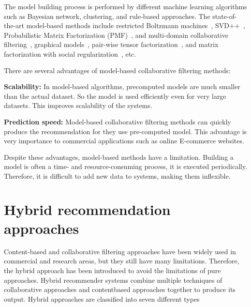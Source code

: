 \documentclass[oneside,13pt]{extreport}
\begin{document}
The model building process is performed by different machine learning algorithms such as Bayesian network, clustering, and rule-based approaches. The state-of-the-art model-based methods include restricted
Boltzmann machines~\cite{salakhutdinov2007restricted}, SVD++~\cite{koren2009matrix}, Probabilistic Matrix Factorization (PMF)~\cite{salakhutdinov2008bayesian}, and multi-domain collaborative filtering~\cite{zhang2012multi}, graphical models~\cite{jin2002preference}, pair-wise tensor factorization~\cite{rendle2010pairwise}, and matrix factorization with social regularization~\cite{ma2011recommender}, etc.

There are several advantages of model-based collaborative filtering methods:
\begin{description}
    \item{\textbf{Scalability:}} In model-based algorithms, precomputed models are much smaller than the actual dataset. So the model is used efficiently even for very large datasets. This improves scalability of the systems. 
    \item{\textbf{Prediction speed:}} Model-based collaborative filtering methods can quickly produce the recommendation for they use pre-computed model. This advantage is very importance to commercial applications such as online E-commerce websites.
\end{description}

Despite these advantages, model-based methods have a limitation. Building a model is often a time- and resource-consuming process, it is executed periodically. Therefore, it is difficult to add new data to systems, making them inflexible.

\section{Hybrid recommendation approaches}
Content-based and collaborative filtering approaches have been widely used in commercial and research areas, but they still have many limitations. Therefore, the hybrid approach has been introduced to avoid the limitations of pure approaches. Hybrid recommender systems combine multiple techniques of collaborative approaches and contentbased approaches together to produce its output. Hybrid approaches are classified into seven different types~\cite{burke2007hybrid}
\end{document}
